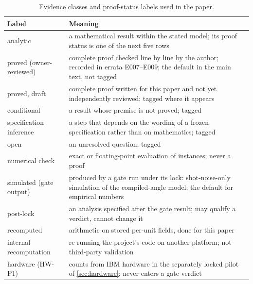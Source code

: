 \documentclass[10pt,twocolumn]{article}
\theoremstyle{definition}
\theoremstyle{remark}
\begin{document}
\begin{table}[h]
\centering\small
\caption{Evidence classes and proof-status labels used in the paper.}\label{tab:labels}
\begin{tabularx}{\textwidth}{@{}>{\raggedright\arraybackslash}p{4.6cm}X@{}}
\toprule
Label & Meaning \\
\midrule
analytic & a mathematical result within the stated model; its proof status is one of the next five rows \\
proved (owner-reviewed) & complete proof checked line by line by the author; recorded in errata E007--E009; the default in the main text, not tagged \\
proved, draft & complete proof written for this paper and not yet independently reviewed; tagged where it appears \\
conditional & a result whose premise is not proved; tagged \\
specification inference & a step that depends on the wording of a frozen specification rather than on mathematics; tagged \\
open & an unresolved question; tagged \\
numerical check & exact or floating-point evaluation of instances; never a proof \\
simulated (gate output) & produced by a gate run under its lock: shot-noise-only simulation of the compiled-angle model; the default for empirical numbers \\
post-lock & an analysis specified after the gate result; may qualify a verdict, cannot change it \\
recomputed & arithmetic on stored per-unit fields, done for this paper \\
internal recomputation & re-running the project's code on another platform; not third-party validation \\
hardware (HW-P1) & counts from IBM hardware in the separately locked pilot of \cref{sec:hardware}; never enters a gate verdict \\
\bottomrule
\end{tabularx}
\end{table}
\end{document}
